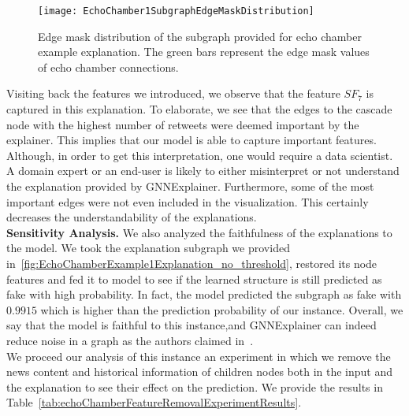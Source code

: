 \begin{figure}
    \centering
    \texttt{[image: EchoChamber1SubgraphEdgeMaskDistribution]}
    \caption[Edge mask distribution of the subgraph provided for echo chamber example explanation.]{Edge mask distribution of the subgraph provided for echo chamber example explanation. The green bars represent the edge mask values of echo chamber connections.}
    \label{fig:EchoChamber1SubgraphEdgeMaskDistribution}
\end{figure}
Visiting back the features we introduced, we observe that the feature $SF_7$ is captured in this explanation. To elaborate, we see that the edges to the cascade node with the highest number of retweets were deemed important by the explainer. This implies that our model is able to capture important features. Although, in order to get this interpretation, one would require a data scientist. A domain expert or an end-user is likely to either misinterpret or not understand the explanation provided by GNNExplainer. Furthermore, some of the most important edges were not even included in the visualization. This certainly decreases the understandability of the explanations. \\
\textbf{Sensitivity Analysis.} We also analyzed the faithfulness of the explanations to the model. We took the explanation subgraph we provided in~\ref{fig:EchoChamberExample1Explanation_no_threshold}, restored its node features and fed it to model to see if the learned structure is still predicted as fake with high probability. In fact, the model predicted the subgraph as fake with $0.9915$ which is higher than the prediction probability of our instance. Overall, we say that the model is faithful to this instance,and GNNExplainer can indeed reduce noise in a graph as the authors claimed in~\cite{GNNExplainer_Ying}.\\
We proceed our analysis of this instance an experiment in which we remove the news content and historical information of children nodes both in the input and the explanation to see their effect on the prediction. We provide the results in Table~\ref{tab:echoChamberFeatureRemovalExperimentResults}.\\
